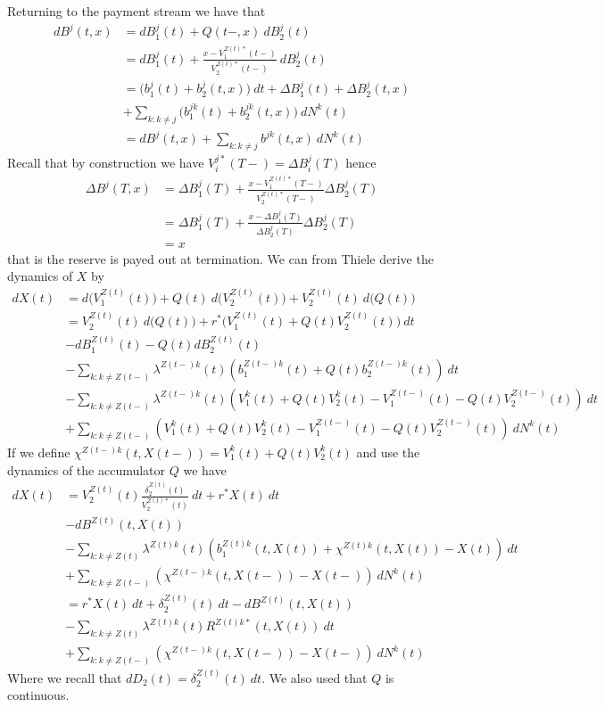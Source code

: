 \documentclass[a4paper,10pt,openany]{book}
\begin{document}
Returning to the payment stream we have that
\begin{align*}
dB^j(t,x)&=dB_1^j(t)+Q(t-,x)\ dB_2^j(t)\\
&=dB_1^j(t)+\frac{x-V_1^{Z(t)*}(t-)}{V_2^{Z(t)*}(t-)}\ dB_2^j(t)\\
&=\Big(b_1^j(t)+b_2^j(t,x)\Big)\ dt+\Delta B_1^j(t)+\Delta B^j_2(t,x)\\
&+\sum_{k:k\ne j}\Big(b_1^{jk}(t)+b_2^{jk}(t,x)\Big)\ dN^k(t)\\
&=dB^{j}(t,x)+\sum_{k:k\ne j}b^{jk}(t,x)\ dN^k(t)
\end{align*}
Recall that by construction we have \(V_i^{j*}(T-)=\Delta B_i^j(T)\) hence
\begin{align*}
\Delta B^j(T,x)&=\Delta B_1^j(T)+\frac{x-V_1^{Z(t)*}(T-)}{V_2^{Z(t)*}(T-)}\Delta B^j_2(T)\\
&=\Delta B_1^j(T)+\frac{x-\Delta B_1^j(T)}{\Delta B_2^j(T)}\Delta B^j_2(T)\\
&=x
\end{align*}
that is the reserve is payed out at termination. We can from Thiele derive the dynamics of \(X\) by
\begin{align*}
dX(t)&=d\Big(V_1^{Z(t)}(t)\Big)+Q(t)\ d\Big(V_2^{Z(t)}(t)\Big)+V_2^{Z(t)}(t)\ d\Big(Q(t)\Big)\\
&=V_2^{Z(t)}(t)\ d\Big(Q(t)\Big)+r^*\Big(V_1^{Z(t)}(t)+Q(t)V_2^{Z(t)}(t)\Big)\ dt\\
&-dB^{Z(t)}_1(t)-Q(t)dB^{Z(t)}_2(t)\\
&-\sum_{k:k\ne Z(t-)}\lambda^{Z(t-)k}(t)\left(b^{Z(t-)k}_1(t)+Q(t)b^{Z(t-)k}_2(t)\right)\ dt\\
&-\sum_{k:k\ne Z(t-)}\lambda^{Z(t-)k}(t)\left(V^{k}_1(t)+Q(t)V^{k}_2(t)-V^{Z(t-)}_1(t)-Q(t)V^{Z(t-)}_2(t)\right)\ dt\\
&+\sum_{k:k\ne Z(t-)}\left(V^{k}_1(t)+Q(t)V^{k}_2(t)-V^{Z(t-)}_1(t)-Q(t)V^{Z(t-)}_2(t)\right)\ dN^k(t)
\end{align*}
If we define \(\chi^{Z(t-)k}(t,X(t-))=V^{k}_1(t)+Q(t)V^{k}_2(t)\) and use the dynamics of the accumulator \(Q\) we have
\begin{align*}
dX(t)&=V_2^{Z(t)}(t)\frac{\delta_2^{Z(t)}(t)}{V_2^{Z(t)*}(t)}\ dt+r^*X(t)\ dt\\
&-dB^{Z(t)}(t,X(t))\\
&-\sum_{k:k\ne Z(t)}\lambda^{Z(t)k}(t)\left(b^{Z(t)k}_1(t,X(t))+\chi^{Z(t)k}(t,X(t))-X(t)\right)\ dt\\
&+\sum_{k:k\ne Z(t-)}\left(\chi^{Z(t-)k}(t,X(t-))-X(t-)\right)\ dN^k(t)\\
&=r^*X(t)\ dt+\delta_2^{Z(t)}(t)\ dt-dB^{Z(t)}(t,X(t))\\
&-\sum_{k:k\ne Z(t)}\lambda^{Z(t)k}(t)R^{Z(t)k*}(t,X(t))\ dt\\
&+\sum_{k:k\ne Z(t-)}\left(\chi^{Z(t-)k}(t,X(t-))-X(t-)\right)\ dN^k(t)
\end{align*}
Where we recall that \(dD_2(t)=\delta_2^{Z(t)}(t)\ dt\). We also used that \(Q\) is continuous.
\end{document}
